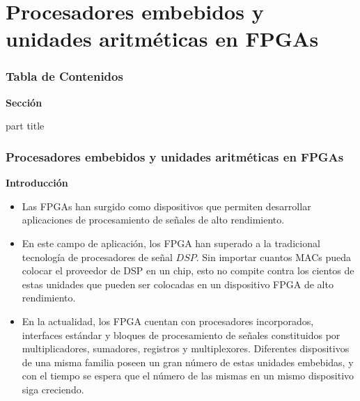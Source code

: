 \section{Procesadores embebidos y unidades aritméticas en FPGAs}
\begin{frame}
  \frametitle{\textbf{Tabla de Contenidos}}
  \begin{center}
    {\vspace{-1.5cm}\Large \textbf{Sección \thesection}\vspace{0.5cm}}
    
    \begin{beamercolorbox}[
      sep=8pt,center]{part title}
      \textbf{\insertsection}
    \end{beamercolorbox}
  \end{center}
\end{frame}


\begin{frame}%
  \frametitle{\textbf{Procesadores embebidos y unidades aritméticas en FPGAs}}
  \begin{block}{\textbf{Introducción}}
    \begin{itemize} \justifying\footnotesize
    \item Las FPGAs han surgido como dispositivos que permiten desarrollar
      aplicaciones de procesamiento de señales de alto rendimiento.
		\item En este campo de aplicación, los FPGA han superado a la tradicional
      tecnología de procesadores de señal \(DSP\). Sin importar cuantos MACs pueda
      colocar el proveedor de DSP en un chip, esto no compite contra los cientos de
      estas unidades que pueden ser colocadas en un dispositivo FPGA de alto
      rendimiento.
		\item En la actualidad, los FPGA cuentan con procesadores incorporados,
      interfaces estándar y bloques de procesamiento de señales constituidos por
      multiplicadores, sumadores, registros y multiplexores. Diferentes
      dispositivos de una misma familia poseen un gran número de estas unidades
      embebidas, y con el tiempo se espera que el número de las mismas en un
      mismo dispositivo siga creciendo.
    \end{itemize}
  \end{block}
\end{frame}

